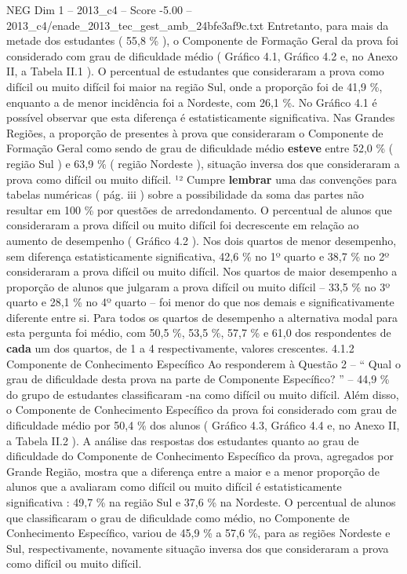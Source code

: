 \begin{textsample}{NEG Dim 1 – 2013\_c4 – Score -5.00 – 2013\_c4/enade\_2013\_tec\_gest\_amb\_24bfe3af9c.txt}
Entretanto, para mais da metade dos estudantes ( 55,8 \% ), o Componente de Formação Geral da prova foi considerado com grau de dificuldade médio ( Gráfico 4.1, Gráfico 4.2 e, no Anexo II, a Tabela II.1 ).
O percentual de estudantes que consideraram a prova como difícil ou muito difícil foi maior na região Sul, onde a proporção foi de 41,9 \%, enquanto a de menor incidência foi a Nordeste, com 26,1 \%.
No Gráfico 4.1 é possível observar que esta diferença é estatisticamente significativa.
Nas Grandes Regiões, a proporção de presentes à prova que consideraram o Componente de Formação Geral como sendo de grau de dificuldade médio \textbf{esteve} entre 52,0 \% ( região Sul ) e 63,9 \% ( região Nordeste ), situação inversa dos que consideraram a prova como difícil ou muito difícil. ¹² Cumpre \textbf{lembrar} uma das convenções para tabelas numéricas ( pág. iii ) sobre a possibilidade da soma das partes não resultar em 100 \% por questões de arredondamento.
O percentual de alunos que consideraram a prova difícil ou muito difícil foi decrescente em relação ao aumento de desempenho ( Gráfico 4.2 ).
Nos dois quartos de menor desempenho, sem diferença estatisticamente significativa, 42,6 \% no 1º quarto e 38,7 \% no 2º consideraram a prova difícil ou muito difícil.
Nos quartos de maior desempenho a proporção de alunos que julgaram a prova difícil ou muito difícil – 33,5 \% no 3º quarto e 28,1 \% no 4º quarto – foi menor do que nos demais e significativamente diferente entre si.
Para todos os quartos de desempenho a alternativa modal para esta pergunta foi médio, com 50,5 \%, 53,5 \%, 57,7 \% e 61,0 dos respondentes de \textbf{cada} um dos quartos, de 1 a 4 respectivamente, valores crescentes. 4.1.2 Componente de Conhecimento Específico Ao responderem à Questão 2 – “ Qual o grau de dificuldade desta prova na parte de Componente Específico? ” – 44,9 \% do grupo de estudantes classificaram -na como difícil ou muito difícil.
Além disso, o Componente de Conhecimento Específico da prova foi considerado com grau de dificuldade médio por 50,4 \% dos alunos ( Gráfico 4.3, Gráfico 4.4 e, no Anexo II, a Tabela II.2 ).
A análise das respostas dos estudantes quanto ao grau de dificuldade do Componente de Conhecimento Específico da prova, agregados por Grande Região, mostra que a diferença entre a maior e a menor proporção de alunos que a avaliaram como difícil ou muito difícil é estatisticamente significativa : 49,7 \% na região Sul e 37,6 \% na Nordeste.
O percentual de alunos que classificaram o grau de dificuldade como médio, no Componente de Conhecimento Específico, variou de 45,9 \% a 57,6 \%, para as regiões Nordeste e Sul, respectivamente, novamente situação inversa dos que consideraram a prova como difícil ou muito difícil.

\end{textsample}
